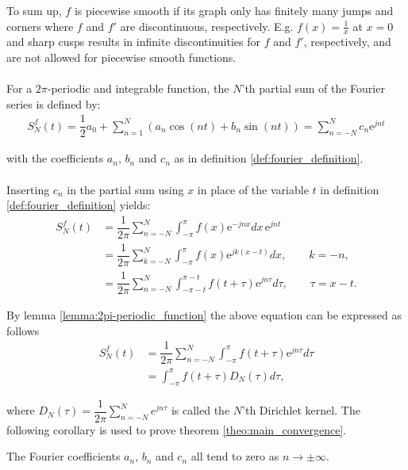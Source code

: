 To sum up, $f$ is piecewise smooth if its graph only has finitely many jumps and corners where $f$ and $f'$ are discontinuous, respectively. E.g. $f(x) = \frac{1}{x}$ at $x = 0$ and sharp cusps results in infinite discontinuities for $f$ and $f'$, respectively, and are not allowed for piecewise smooth functions.
\\ \\
For a $2\pi$-periodic and integrable function, the $N$'th partial sum of the Fourier series is defined by:
\begin{align}\label{eq:partialsumFourierSeries}
	S_N^f(t) = \dfrac{1}{2} a_0 + \sum_{n=1}^N\left(a_n \cos(n 		t) + b_n \sin(n t) \right) = \sum_{n=-N}^N c_n \text{e}^{j n t}
\end{align}

with the coefficients $a_n$, $b_n$ and $c_n$ as in definition \ref{def:fourier_definition}.
\\ \\
Inserting $c_n$ in the partial sum using $x$ in place of the variable $t$ in definition \ref{def:fourier_definition} yields:
\begin{align*}
	S_N^f(t)
	&= \dfrac{1}{2\pi}\sum_{n=-N}^N \int_{-\pi}^\pi f(x) 			\text{e}^{-j n x} dx\, \text{e}^{j n t} \\
	&= \dfrac{1}{2\pi}\sum_{k = -N}^N \int_{-\pi}^\pi f(x) 			\text{e}^{j k (x-t)} dx, \quad \quad k = -n, \\
	&= \dfrac{1}{2\pi} \sum_{n = -N}^N \int_{-\pi - t}^{\pi - 		t} f(t + \tau ) \text{e}^{j n \tau} d\tau, \quad \quad \tau 	= x-t.
\end{align*}

By lemma \ref{lemma:2pi-periodic_function} the above equation can be expressed as follows
\begin{align} \label{eq:dirichlet}
	S_N^f (t) 
	&= \dfrac{1}{2\pi} \sum_{n=-N}^N \int_{-\pi}^\pi f(t + 			\tau) \text{e}^{j n \tau} d\tau \nonumber \\
	&= \int_{-\pi}^\pi f(t + \tau) D_N(\tau) d\tau,
\end{align}

where $D_N(\tau) = \dfrac{1}{2\pi}\sum_{n=-N}^{N}e^{j n \tau}$ is called the $N$'th Dirichlet kernel. The following corollary is used to prove theorem \ref{theo:main_convergence}.
\begin{corollary} \label{coro:conv_Fourier_coeff}
The Fourier coefficients $a_n$, $b_n$ and $c_n$ all tend to zero as $n \to \pm \infty$.
\end{corollary}


